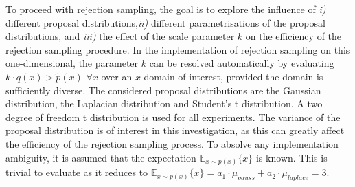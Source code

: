\documentclass{article}
\begin{document}
	To proceed with rejection sampling, the goal is to explore the influence of \emph{i)} different proposal distributions,\emph{ii)} different parametrisations of the proposal distributions, and \emph{iii)} the effect of the scale parameter $k$ on the efficiency of the rejection sampling procedure. In the implementation of rejection sampling on this one-dimensional, the parameter $k$ can be resolved automatically by evaluating $k \cdot q(x) > \tilde{p}(x)$ $\forall x$ over an $x$-domain of interest, provided the domain is sufficiently diverse. The considered proposal distributions are the Gaussian distribution, the Laplacian distribution and Student's t distribution. A two degree of freedom t distribution is used for all experiments. The variance of the proposal distribution is of interest in this investigation, as this can greatly affect the efficiency of the rejection sampling process. To absolve any implementation ambiguity, it is assumed that the expectation $\mathbb{E}_{x \sim p(x)} \{ x\}$ is known. This is trivial to evaluate as it reduces to $\mathbb{E}_{x \sim p(x)} \{ x\} = a_1 \cdot \mu_{gauss} + a_2 \cdot \mu_{laplace} = 3$.
	
\end{document}
